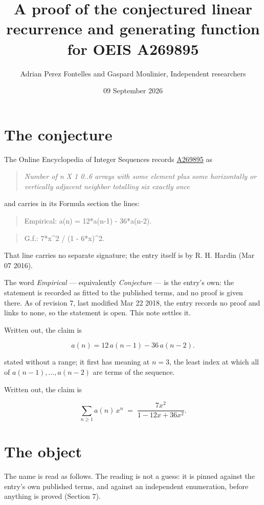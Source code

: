 \documentclass[11pt]{article}
\title{A proof of the conjectured linear recurrence and generating function for OEIS A269895}
\author{Adrian Perez Fontelles and Gaspard Moulinier, Independent researchers}
\date{09 September 2026}
\theoremstyle{definition}
\begin{document}
\maketitle
\section{The conjecture}

The Online Encyclopedia of Integer Sequences records \href{https://oeis.org/A269895}{A269895} as

\begin{quote}\itshape Number of n X 1 0..6 arrays with some element plus some horizontally or vertically adjacent neighbor totalling six exactly once\end{quote}

and carries in its Formula section the lines:

\begin{quote}\ttfamily Empirical: a(n) = 12*a(n-1) - 36*a(n-2).\end{quote}

\begin{quote}\ttfamily G.f.: 7*x\textasciicircum{}2 / (1 - 6*x)\textasciicircum{}2.\end{quote}

That line carries no separate signature; the entry itself is by R. H. Hardin (Mar 07 2016).

The word {\itshape Empirical} --- equivalently {\itshape Conjecture} --- is the entry's own: the statement is recorded as fitted to the published terms, and no proof is given there. As of revision 7, last modified Mar 22 2018, the entry records no proof and links to none, so the statement is open. This note settles it.

Written out, the claim is

\[a(n) = 12\,a(n-1) - 36\,a(n-2).\]

stated without a range; it first has meaning at $n = 3$, the least index at which all of $a(n-1),\dots,a(n-2)$ are terms of the sequence.

Written out, the claim is

\[\sum_{n \ge 1} a(n)\,x^n \;=\; \frac{7x^{2}}{1 - 12x + 36x^{2}}.\]

\section{The object}

The name is read as follows. The reading is not a guess: it is pinned against the entry's own published terms, and against an independent enumeration, before anything is proved (Section 7).
\end{document}
